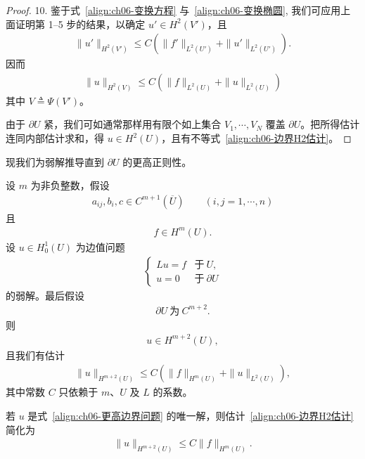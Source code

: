 \documentclass[../../main.tex]{subfiles}
\begin{document}
\begin{proof}
10. 鉴于式~\eqref{align:ch06-变换方程} 与~\eqref{align:ch06-变换椭圆}, 我们可应用上面证明第 1--5 步的结果，以确定 $u'\in H^{2}(V')$，且
\begin{align*}
\|u'\|_{H^{2}(V')}\leqslant C(\|f'\|_{L^{2}(U')}+\|u'\|_{L^{2}(U')}).
\end{align*}
因而
\begin{align}
\|u\|_{H^{2}(V)}\leqslant C(\|f\|_{L^{2}(U)}+\|u\|_{L^{2}(U)})
\end{align}
其中 $V\triangleq\Psi(V')$。

由于 $\partial U$ 紧，我们可如通常那样用有限个如上集合 $V_{1},\cdots,V_{N}$ 覆盖 $\partial U$。把所得估计连同内部估计求和，得 $u\in H^{2}(U)$，且有不等式~\eqref{align:ch06-边界H2估计}。
\end{proof}

现我们为弱解推导直到 $\partial U$ 的更高正则性。

\begin{theorem}[更高边界正则性]\label{theorem:ch06-更高边界正则}设 $m$ 为非负整数，假设
\begin{align}
a_{ij},b_{i},c\in C^{m+1}(\overline{U})\qquad (i,j=1,\cdots,n)
\end{align}
且
\begin{align}
f\in H^{m}(U).
\end{align}
设 $u\in H^{1}_{0}(U)$ 为边值问题
\begin{align}
\begin{cases}
Lu=f & \text{于}\ U,\\
u=0 & \text{于}\ \partial U
\end{cases}
\end{align}
的弱解。最后假设
\begin{align}
\partial U\ \text{为}\ C^{m+2}.
\end{align}
则
\begin{align}
u\in H^{m+2}(U),
\end{align}
且我们有估计
\begin{align}
\|u\|_{H^{m+2}(U)}\leqslant C(\|f\|_{H^{m}(U)}+\|u\|_{L^{2}(U)}),
\end{align}
其中常数 $C$ 只依赖于 $m$、$U$ 及 $L$ 的系数。
\end{theorem}

\begin{remark}\label{remark:ch06-更高边界正则}
若 $u$ 是式~\eqref{align:ch06-更高边界问题} 的唯一解，则估计~\eqref{align:ch06-边界H2估计} 简化为
\begin{align*}
\|u\|_{H^{m+2}(U)}\leqslant C\|f\|_{H^{m}(U)}.
\end{align*}
\end{remark}
\end{document}
